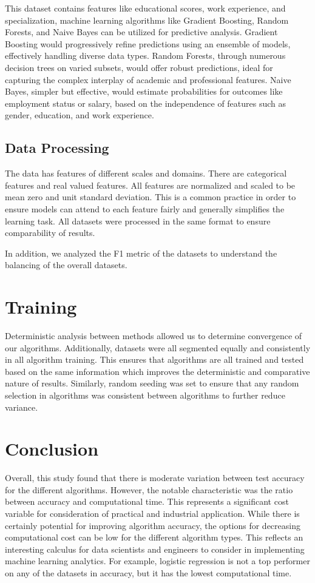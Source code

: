 \documentclass[10pt,twocolumn,letterpaper]{article}
\begin{document}
This dataset contains features like educational scores, work experience, and specialization, machine learning algorithms like Gradient Boosting, Random Forests, and Naive Bayes can be utilized for predictive analysis.
Gradient Boosting would progressively refine predictions using an ensemble of models, effectively handling diverse data types.
Random Forests, through numerous decision trees on varied subsets, would offer robust predictions, ideal for capturing the complex interplay of academic and professional features.
Naive Bayes, simpler but effective, would estimate probabilities for outcomes like employment status or salary, based on the independence of features such as gender, education, and work experience.

\subsection{Data Processing}

The data has features of different scales and domains.
There are categorical features and real valued features.
All features are normalized and scaled to be mean zero and unit standard deviation.
This is a common practice in order to ensure models can attend to each feature fairly and generally simplifies the learning task.
All datasets were processed in the same format to ensure comparability of results.

In addition, we analyzed the F1 metric of the datasets to understand the balancing of the overall datasets.


\section{Training}

Deterministic analysis between methods allowed us to determine convergence of our algorithms.
Additionally, datasets were all segmented equally and consistently in all algorithm training.
This ensures that algorithms are all trained and tested based on the same information which improves the deterministic and comparative nature of results.
Similarly, random seeding was set to ensure that any random selection in algorithms was consistent between algorithms to further reduce variance.

\section{Conclusion}

Overall, this study found that there is moderate variation between test accuracy for the different algorithms.
However, the notable characteristic was the ratio between accuracy and computational time.
This represents a significant cost variable for consideration of practical and industrial application.
While there is certainly potential for improving algorithm accuracy, the options for decreasing computational cost can be low for the different algorithm types.
This reflects an interesting calculus for data scientists and engineers to consider in implementing machine learning analytics.
For example, logistic regression is not a top performer on any of the datasets in accuracy, but it has the lowest computational time.
\end{document}
